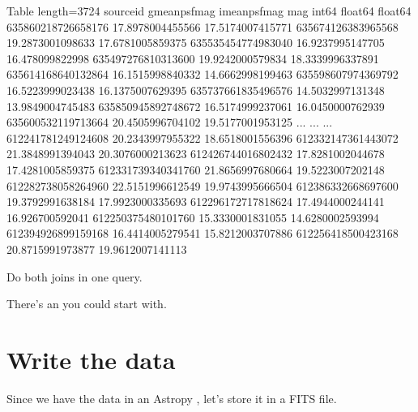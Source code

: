 \documentclass[letterpaper,10pt,english]{sphinxmanual}
\begin{document}
\begin{sphinxVerbatim}[commandchars=\\\{\}]
\PYGZlt{}Table length=3724\PYGZgt{}
    source\PYGZus{}id       g\PYGZus{}mean\PYGZus{}psf\PYGZus{}mag   i\PYGZus{}mean\PYGZus{}psf\PYGZus{}mag 
                                          mag       
      int64            float64          float64     
\PYGZhy{}\PYGZhy{}\PYGZhy{}\PYGZhy{}\PYGZhy{}\PYGZhy{}\PYGZhy{}\PYGZhy{}\PYGZhy{}\PYGZhy{}\PYGZhy{}\PYGZhy{}\PYGZhy{}\PYGZhy{}\PYGZhy{}\PYGZhy{}\PYGZhy{}\PYGZhy{} \PYGZhy{}\PYGZhy{}\PYGZhy{}\PYGZhy{}\PYGZhy{}\PYGZhy{}\PYGZhy{}\PYGZhy{}\PYGZhy{}\PYGZhy{}\PYGZhy{}\PYGZhy{}\PYGZhy{}\PYGZhy{}\PYGZhy{}\PYGZhy{} \PYGZhy{}\PYGZhy{}\PYGZhy{}\PYGZhy{}\PYGZhy{}\PYGZhy{}\PYGZhy{}\PYGZhy{}\PYGZhy{}\PYGZhy{}\PYGZhy{}\PYGZhy{}\PYGZhy{}\PYGZhy{}\PYGZhy{}\PYGZhy{}
635860218726658176 17.8978004455566 17.5174007415771
635674126383965568 19.2873001098633 17.6781005859375
635535454774983040 16.9237995147705  16.478099822998
635497276810313600 19.9242000579834 18.3339996337891
635614168640132864 16.1515998840332 14.6662998199463
635598607974369792 16.5223999023438 16.1375007629395
635737661835496576 14.5032997131348 13.9849004745483
635850945892748672 16.5174999237061 16.0450000762939
635600532119713664 20.4505996704102 19.5177001953125
               ...              ...              ...
612241781249124608 20.2343997955322 18.6518001556396
612332147361443072 21.3848991394043 20.3076000213623
612426744016802432 17.8281002044678 17.4281005859375
612331739340341760 21.8656997680664 19.5223007202148
612282738058264960 22.5151996612549 19.9743995666504
612386332668697600 19.3792991638184 17.9923000335693
612296172717818624 17.4944000244141  16.926700592041
612250375480101760 15.3330001831055 14.6280002593994
612394926899159168 16.4414005279541 15.8212003707886
612256418500423168 20.8715991973877 19.9612007141113
\end{sphinxVerbatim}


Do both joins in one query.

There’s an  you could start with.


\section{Write the data}
\label{\detokenize{05_join:write-the-data}}
Since we have the data in an Astropy , let’s store it in a FITS file.
\end{document}
